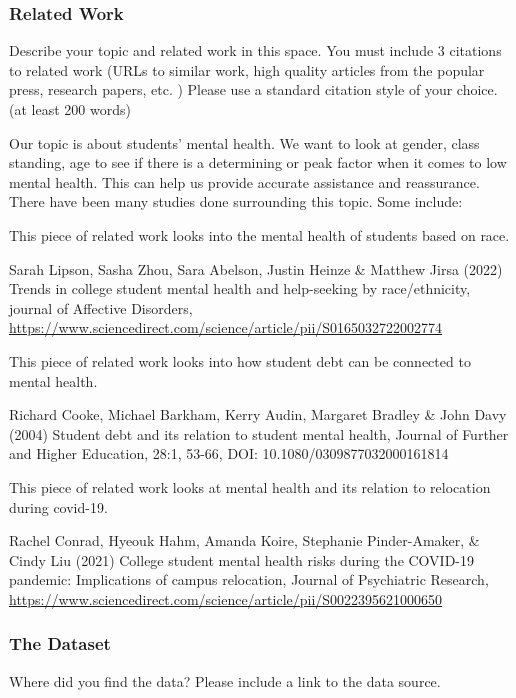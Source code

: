 \documentclass[
]{article}
\begin{document}
\hypertarget{related-work}{%
\subsubsection{Related Work}\label{related-work}}

Describe your topic and related work in this space. You must include 3
citations to related work (URLs to similar work, high quality articles
from the popular press, research papers, etc. ) Please use a standard
citation style of your choice. (at least 200 words)

Our topic is about students' mental health. We want to look at gender,
class standing, age to see if there is a determining or peak factor when
it comes to low mental health. This can help us provide accurate
assistance and reassurance. There have been many studies done
surrounding this topic. Some include:

This piece of related work looks into the mental health of students
based on race.

Sarah Lipson, Sasha Zhou, Sara Abelson, Justin Heinze \& Matthew Jirsa
(2022) Trends in college student mental health and help-seeking by
race/ethnicity, journal of Affective Disorders,
\url{https://www.sciencedirect.com/science/article/pii/S0165032722002774}

This piece of related work looks into how student debt can be connected
to mental health.

Richard Cooke, Michael Barkham, Kerry Audin, Margaret Bradley \& John
Davy (2004) Student debt and its relation to student mental health,
Journal of Further and Higher Education, 28:1, 53-66, DOI:
10.1080/0309877032000161814

This piece of related work looks at mental health and its relation to
relocation during covid-19.

Rachel Conrad, Hyeouk Hahm, Amanda Koire, Stephanie Pinder-Amaker, \&
Cindy Liu (2021) College student mental health risks during the COVID-19
pandemic: Implications of campus relocation, Journal of Psychiatric
Research,
\url{https://www.sciencedirect.com/science/article/pii/S0022395621000650}

\hypertarget{the-dataset}{%
\subsubsection{The Dataset}\label{the-dataset}}

Where did you find the data? Please include a link to the data source.
\end{document}
